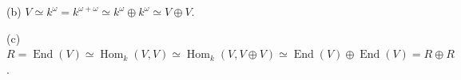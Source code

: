 \begin{enumerate}
    (b) $V\simeq k^\omega=k^{\omega+\omega}
    \simeq k^\omega\oplus k^\omega\simeq V\oplus V$.

    (c) $R=\operatorname{End}(V)
    \simeq\operatorname{Hom}_k(V,V) \simeq \operatorname{Hom}_k(V,V\oplus V)\simeq \operatorname{End}(V)\oplus\operatorname{End}(V)=R\oplus R$.
    
    \end{enumerate}